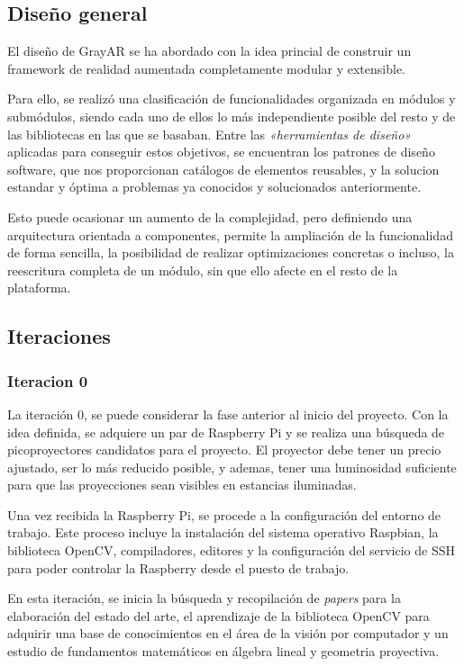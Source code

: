 \subsection{Diseño general}
El diseño de GrayAR se ha abordado con la idea princial de construir un framework de realidad aumentada completamente modular y extensible. 

Para ello, se realizó una clasificación de funcionalidades organizada en módulos y submódulos, siendo cada uno de ellos lo más independiente posible del resto y de las bibliotecas en las que se basaban. Entre las \textit{«herramientas de diseño»} aplicadas para conseguir estos objetivos, se encuentran los patrones de diseño software, que nos proporcionan catálogos de elementos reusables, y la solucion estandar y óptima a problemas ya conocidos y solucionados anteriormente.

Esto puede ocasionar un aumento de la complejidad, pero definiendo una arquitectura orientada a componentes, permite la ampliación de la funcionalidad de forma sencilla, la posibilidad de realizar optimizaciones concretas o incluso, la reescritura completa de un módulo, sin que ello afecte en el resto de la plataforma. 

\subsection{Iteraciones}
\subsubsection{Iteracion 0}
La iteración 0, se puede considerar la fase anterior al inicio del proyecto. Con la idea definida, se adquiere un par de Raspberry Pi y se realiza una búsqueda de picoproyectores candidatos para el proyecto. El proyector debe tener un precio ajustado, ser lo más reducido posible, y ademas, tener una luminosidad suficiente para que las proyecciones sean visibles en estancias iluminadas.  

Una vez recibida la Raspberry Pi, se procede a la configuración del entorno de trabajo. Este proceso incluye la instalación del sistema operativo Raspbian, la biblioteca OpenCV, compiladores, editores y la configuración del servicio de SSH para poder controlar la Raspberry desde el puesto de trabajo.

En esta iteración, se inicia la búsqueda y recopilación de \textit{papers} para la elaboración del estado del arte, el aprendizaje de la biblioteca OpenCV para adquirir una base de conocimientos en el área de la visión por computador y un estudio de fundamentos matemáticos en álgebra lineal y geometria proyectiva.

